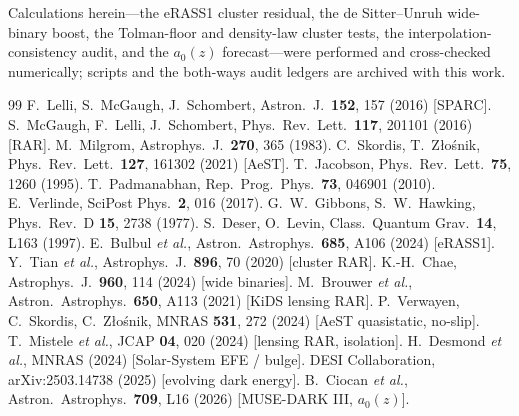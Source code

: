 \documentclass[aps,prd,twocolumn,10pt,nofootinbib,superscriptaddress]{revtex4-2}
\begin{document}
\begin{acknowledgments}
Calculations herein---the eRASS1 cluster residual, the de Sitter--Unruh wide-binary boost, the Tolman-floor and
density-law cluster tests, the interpolation-consistency audit, and the $a_0(z)$ forecast---were performed and
cross-checked numerically; scripts and the both-ways audit ledgers are archived with this work.
\end{acknowledgments}

\begin{thebibliography}{99}
 F.~Lelli, S.~McGaugh, J.~Schombert, Astron.\ J.\ \textbf{152}, 157 (2016) [SPARC].
 S.~McGaugh, F.~Lelli, J.~Schombert, Phys.\ Rev.\ Lett.\ \textbf{117}, 201101 (2016) [RAR].
 M.~Milgrom, Astrophys.\ J.\ \textbf{270}, 365 (1983).
 C.~Skordis, T.~Z\l o\'snik, Phys.\ Rev.\ Lett.\ \textbf{127}, 161302 (2021) [AeST].
 T.~Jacobson, Phys.\ Rev.\ Lett.\ \textbf{75}, 1260 (1995).
 T.~Padmanabhan, Rep.\ Prog.\ Phys.\ \textbf{73}, 046901 (2010).
 E.~Verlinde, SciPost Phys.\ \textbf{2}, 016 (2017).
 G.~W.~Gibbons, S.~W.~Hawking, Phys.\ Rev.\ D \textbf{15}, 2738 (1977).
 S.~Deser, O.~Levin, Class.\ Quantum Grav.\ \textbf{14}, L163 (1997).
 E.~Bulbul \emph{et al.}, Astron.\ Astrophys.\ \textbf{685}, A106 (2024) [eRASS1].
 Y.~Tian \emph{et al.}, Astrophys.\ J.\ \textbf{896}, 70 (2020) [cluster RAR].
 K.-H.~Chae, Astrophys.\ J.\ \textbf{960}, 114 (2024) [wide binaries].
 M.~Brouwer \emph{et al.}, Astron.\ Astrophys.\ \textbf{650}, A113 (2021) [KiDS lensing RAR].
 P.~Verwayen, C.~Skordis, C.~Z\l o\'snik, MNRAS \textbf{531}, 272 (2024) [AeST quasistatic, no-slip].
 T.~Mistele \emph{et al.}, JCAP \textbf{04}, 020 (2024) [lensing RAR, isolation].
 H.~Desmond \emph{et al.}, MNRAS (2024) [Solar-System EFE / bulge].
 DESI Collaboration, arXiv:2503.14738 (2025) [evolving dark energy].
 B.~Ciocan \emph{et al.}, Astron.\ Astrophys.\ \textbf{709}, L16 (2026) [MUSE-DARK III, $a_0(z)$].
\end{thebibliography}
\end{document}
